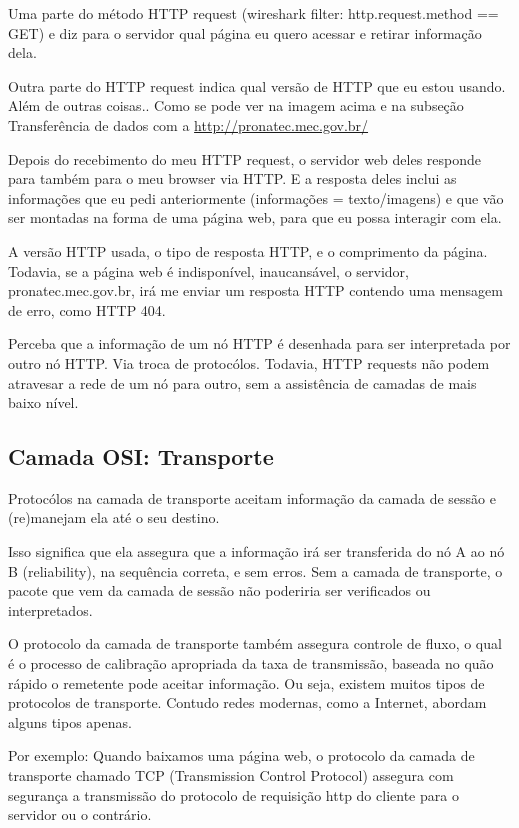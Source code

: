 \documentclass[13pt, a4paper]{article}
\begin{document}
Uma parte do método HTTP request (wireshark filter: http.request.method == GET) e diz para o servidor qual página eu quero acessar
e retirar informação dela.

Outra parte do HTTP request indica qual versão de HTTP que eu estou usando. Além de outras coisas.. Como se pode ver na imagem acima e na subseção Transferência de dados com a \href{http://pronatec.mec.gov.br/}{http://pronatec.mec.gov.br/}

Depois do recebimento do meu HTTP request, o servidor web deles responde para também para o meu
browser via HTTP. E a resposta deles inclui as informações que eu pedi anteriormente (informações = texto/imagens)
e que vão ser montadas na forma de uma página web, para que eu possa interagir com ela.

A versão HTTP usada, o tipo de resposta HTTP, e o comprimento da página. Todavia, se a página web é indisponível, inaucansável,
o servidor, pronatec.mec.gov.br, irá me enviar um resposta HTTP contendo uma mensagem de erro, como HTTP 404.

Perceba que a informação de um nó HTTP é desenhada para ser interpretada por outro nó HTTP. Via troca de protocólos. Todavia,
HTTP requests não podem atravesar a rede de um nó para outro, sem a assistência de camadas de mais baixo nível. \cite{osi}

\subsection{Camada OSI: Transporte}

Protocólos na camada de transporte aceitam informação da camada de sessão e (re)manejam
ela até o seu destino.

Isso significa que ela assegura que a informação irá ser transferida do nó A ao nó B (reliability), na sequência correta, e sem erros. Sem a camada de transporte, o pacote que vem da camada de sessão não poderiria ser verificados ou interpretados.

O protocolo da camada de transporte também assegura controle de fluxo, o qual é o processo de calibração apropriada da taxa de transmissão, baseada no quão rápido o remetente pode aceitar informação. Ou seja, existem muitos tipos de protocolos de transporte. Contudo redes modernas, como a Internet, abordam alguns tipos apenas.

Por exemplo: Quando baixamos uma página web, o protocolo da camada de transporte chamado TCP (Transmission Control Protocol) assegura com segurança a transmissão do protocolo de requisição http do cliente para o servidor ou o contrário. \cite{osi}
\end{document}
